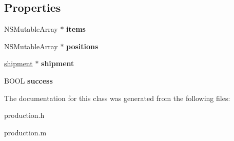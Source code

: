 \subsection*{Properties}
\begin{DoxyCompactItemize}
\item 
\hypertarget{interfaceproduction_aabf989cb12c2c6745b2a0771bd91d9f2}{}N\+S\+Mutable\+Array $\ast$ {\bfseries items}\label{interfaceproduction_aabf989cb12c2c6745b2a0771bd91d9f2}

\item 
\hypertarget{interfaceproduction_a0e719d81253a70e745719acdcab59fd3}{}N\+S\+Mutable\+Array $\ast$ {\bfseries positions}\label{interfaceproduction_a0e719d81253a70e745719acdcab59fd3}

\item 
\hypertarget{interfaceproduction_acb16489c9fc1c6e64b93136d0c77e6c1}{}\hyperlink{interfaceshipment}{shipment} $\ast$ {\bfseries shipment}\label{interfaceproduction_acb16489c9fc1c6e64b93136d0c77e6c1}

\item 
\hypertarget{interfaceproduction_a1ca9c6d9dc40a84516a1d8c74c237532}{}B\+O\+O\+L {\bfseries success}\label{interfaceproduction_a1ca9c6d9dc40a84516a1d8c74c237532}

\end{DoxyCompactItemize}


The documentation for this class was generated from the following files\+:\begin{DoxyCompactItemize}
\item 
production.\+h\item 
production.\+m\end{DoxyCompactItemize}
